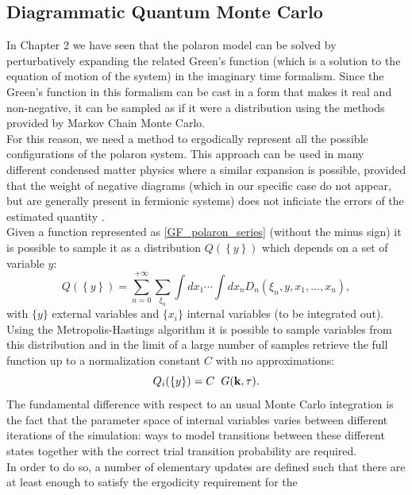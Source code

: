 \subsection{Diagrammatic Quantum Monte Carlo}
In Chapter 2 we have seen that the polaron model can be solved by perturbatively expanding the related Green's function (which is a 
solution to the equation of motion of the system) in the imaginary time formalism. Since the Green's function in this formalism can be cast 
in a form that makes it real and non-negative, it can be sampled as if it were a distribution using the methods provided by Markov Chain Monte Carlo.\\
For this reason, we need a method to ergodically represent all the possible configurations of the polaron system. This approach can be used in many different condensed 
matter physics where a similar expansion is possible, provided that the weight of negative diagrams (which in our specific case do not appear, but are generally present in fermionic 
systems) does not inficiate the errors of the estimated quantity \cite{gull2011continuous}.\\
Given a function represented as \ref{GF_polaron_series} (without the minus sign) it is possible to sample it as a distribution $Q(\left\{y\right\})$ 
which depends on a set of variable $y$:
\begin{equation}
    Q(\left\{y\right\})=\sum_{n=0}^{+\infty}\sum_{\xi_n}\int dx_1 \cdots \int dx_n D_n(\xi_n,{y},x_1,...,x_n),
\end{equation}
with $\{y\}$ external variables and $\{x_i\}$ internal variables (to be integrated out).\\
Using the Metropolis-Hastings algorithm it is possible to sample variables from this distribution and in the limit of a large number of 
samples retrieve the full function up to a normalization constant $C$ with no approximations:
\begin{equation}
    Q_i(\{y\})=C\hspace{0.2cm} G(\mathbf{k},\tau).
\end{equation}
The fundamental difference with respect to an usual Monte Carlo integration is the fact that the parameter space of internal variables 
varies between different iterations of the simulation: ways to model transitions between these different states together with the correct trial transition probability 
are required.\\
In order to do so, a number of elementary updates are defined such that there are at least enough to satisfy the ergodicity requirement \cite{gubernatis2016quantum} for the 
